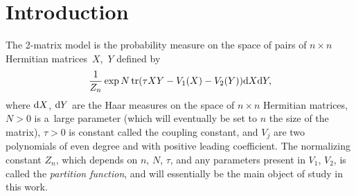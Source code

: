 \documentclass[pdftex]{sigma}
\DeclareMathOperator{\tr}{tr}
\numberwithin{equation}{section}
\begin{document}
\section{Introduction}

The 2-matrix model is the probability measure on the space of pairs of $n \times n$ Hermitian matrices~$X$,~$Y$ defined by
\begin{equation} \label{eq:twomatrixmodel}
 \frac{1}{Z_{n}} \exp N \tr (\tau X Y- V_1(X) -V_2(Y) ) {\rm d}X {\rm d}Y,
\end{equation}
where ${\rm d}X$, ${\rm d}Y$ are the Haar measures on the space of $n\times n$ Hermitian matrices, $N>0$ is a~large parameter (which will eventually be set to $n$ the size of the matrix), $\tau>0$ is constant called the coupling constant, and $V_j$ are two polynomials of even degree and with positive leading coefficient. The normalizing constant $Z_{n}$, which depends on $n$, $N$, $\tau$, and any parameters present in $V_1$, $V_2$, is called the \textit{partition function}, and will essentially be the main object of study in this work.
\end{document}
